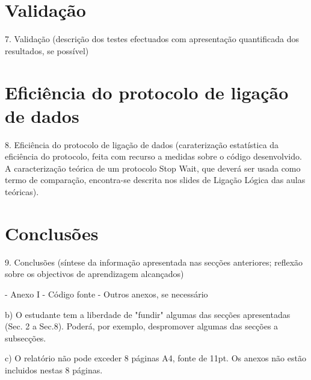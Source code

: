 \documentclass[article, a4paper, 11pt, oneside]{memoir}
\begin{document}
\newpage
\chapter[Validação][Validação]{Validação} \label{\thechapter}

7. Validação
  (descrição dos testes efectuados com apresentação quantificada dos resultados, se possível)

\newpage
\chapter[Eficiência do protocolo de ligação de dados][Eficiência do protocolo de ligação de dados]{Eficiência do protocolo de ligação de dados} \label{\thechapter}

8. Eficiência do protocolo de ligação de dados (caraterização estatística da  eficiência do protocolo, feita com recurso a medidas sobre o código desenvolvido. 
A caracterização teórica de um protocolo Stop Wait, que 
   deverá ser usada como termo de comparação, encontra-se descrita nos slides de Ligação Lógica das aulas teóricas).

\newpage
\chapter[Conclusões][Conclusões]{Conclusões} \label{\thechapter}

9. Conclusões
  (síntese da informação apresentada nas secções anteriores; reflexão sobre os objectivos de aprendizagem alcançados)

- Anexo I - Código fonte
- Outros anexos, se necessário


b) O estudante tem a liberdade de "fundir" algumas das secções apresentadas (Sec. 2 a Sec.8). Poderá, por exemplo, despromover algumas das secções a subsecções.


c) O relatório não pode exceder 8 páginas A4, fonte de 11pt. Os anexos não estão incluidos nestas 8 páginas.
\end{document}
